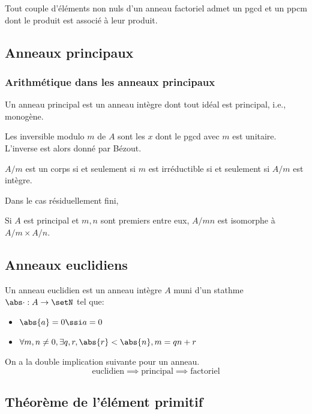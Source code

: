 \documentclass[a4paper,11pt,twocolumn]{article}
\begin{document}
     Tout couple d'éléments non nuls d'un anneau factoriel admet un pgcd et un ppcm dont le produit est associé à leur produit.

  \subsection{Anneaux principaux}

    \subsubsection{Arithmétique dans les anneaux principaux}

     Un anneau principal est un anneau intègre dont tout idéal est principal, i.e., monogène.

     Les inversible modulo $m$ de $A$ sont les $x$ dont le pgcd avec $m$ est unitaire. L'inverse est alors donné par Bézout.

     $A/m$ est un corps si et seulement si $m$ est irréductible si et seulement si $A/m$ est intègre.

      Dans le cas résiduellement fini, 

     Si $A$ est principal et $m,n$ sont premiers entre eux, $A/mn$ est isomorphe à $A/m\times A/n$.

  \subsection{Anneaux euclidiens}

     Un anneau euclidien est un anneau intègre $A$ muni d'un stathme $\abs\cdot:A\rightarrow\setN$ tel que:
    \begin{itemize}
      \item $\abs{a}=0\ssi a=0$
      \item $\forall m,n\neq 0, \exists q,r, \abs{r}<\abs{n}, m=qn+r$
    \end{itemize}

     On a la double implication suivante pour un anneau.
    \[\text{euclidien} \implies \text{principal} \implies \text{factoriel}\]


  \subsection{Théorème de l'élément primitif}
\end{document}
